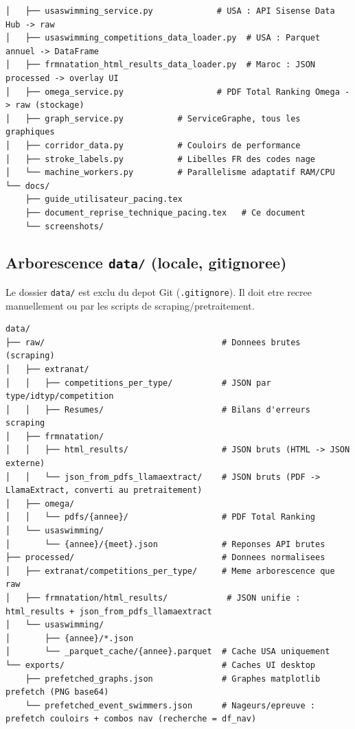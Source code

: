 \documentclass[11pt,a4paper]{article}
\begin{document}
\begin{lstlisting}
│   ├── usaswimming_service.py             # USA : API Sisense Data Hub -> raw
│   ├── usaswimming_competitions_data_loader.py  # USA : Parquet annuel -> DataFrame
│   ├── frmnatation_html_results_data_loader.py  # Maroc : JSON processed -> overlay UI
│   ├── omega_service.py                   # PDF Total Ranking Omega -> raw (stockage)
│   ├── graph_service.py           # ServiceGraphe, tous les graphiques
│   ├── corridor_data.py           # Couloirs de performance
│   ├── stroke_labels.py           # Libelles FR des codes nage
│   └── machine_workers.py         # Parallelisme adaptatif RAM/CPU
└── docs/
    ├── guide_utilisateur_pacing.tex
    ├── document_reprise_technique_pacing.tex   # Ce document
    └── screenshots/
\end{lstlisting}

\subsection{Arborescence \texttt{data/} (locale, gitignoree)}

Le dossier \texttt{data/} est exclu du depot Git (\texttt{.gitignore}). Il doit etre recree manuellement ou par les scripts de scraping/pretraitement.

\begin{lstlisting}
data/
├── raw/                                    # Donnees brutes (scraping)
│   ├── extranat/
│   │   ├── competitions_per_type/          # JSON par type/idtyp/competition
│   │   ├── Resumes/                        # Bilans d'erreurs scraping
│   ├── frmnatation/
│   │   ├── html_results/                   # JSON bruts (HTML -> JSON externe)
│   │   └── json_from_pdfs_llamaextract/    # JSON bruts (PDF -> LlamaExtract, converti au pretraitement)
│   ├── omega/
│   │   └── pdfs/{annee}/                   # PDF Total Ranking
│   └── usaswimming/
│       └── {annee}/{meet}.json             # Reponses API brutes
├── processed/                              # Donnees normalisees
│   ├── extranat/competitions_per_type/     # Meme arborescence que raw
│   ├── frmnatation/html_results/            # JSON unifie : html_results + json_from_pdfs_llamaextract 
│   └── usaswimming/
│       ├── {annee}/*.json
│       └── _parquet_cache/{annee}.parquet  # Cache USA uniquement
└── exports/                                # Caches UI desktop
    ├── prefetched_graphs.json              # Graphes matplotlib prefetch (PNG base64)
    └── prefetched_event_swimmers.json      # Nageurs/epreuve : prefetch couloirs + combos nav (recherche = df_nav)
\end{lstlisting}
\end{document}
